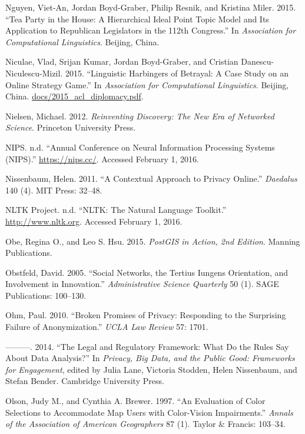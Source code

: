 \documentclass[]{krantz}
\begin{document}
\hypertarget{ref-Nguyen:Boyd-Graber:Resnik:Miler-2015}{}
Nguyen, Viet-An, Jordan Boyd-Graber, Philip Resnik, and Kristina Miler.
2015. ``Tea Party in the House: A Hierarchical Ideal Point Topic Model
and Its Application to Republican Legislators in the 112th Congress.''
In \emph{Association for Computational Linguistics}. Beijing, China.

\hypertarget{ref-niculae-15}{}
Niculae, Vlad, Srijan Kumar, Jordan Boyd-Graber, and Cristian
Danescu-Niculescu-Mizil. 2015. ``Linguistic Harbingers of Betrayal: A
Case Study on an Online Strategy Game.'' In \emph{Association for
Computational Linguistics}. Beijing, China.
\url{docs/2015_acl_diplomacy.pdf}.

\hypertarget{ref-nielsen2012reinventing}{}
Nielsen, Michael. 2012. \emph{Reinventing Discovery: The New Era of
Networked Science}. Princeton University Press.

\hypertarget{ref-nips}{}
NIPS. n.d. ``Annual Conference on Neural Information Processing Systems
(NIPS).'' \url{https://nips.cc/}. Accessed February 1, 2016.

\hypertarget{ref-nissenbaum2011contextual}{}
Nissenbaum, Helen. 2011. ``A Contextual Approach to Privacy Online.''
\emph{Daedalus} 140 (4). MIT Press: 32--48.

\hypertarget{ref-NLTKweb}{}
NLTK Project. n.d. ``NLTK: The Natural Language Toolkit.''
\url{http://www.nltk.org}. Accessed February 1, 2016.

\hypertarget{ref-PostGISInAction}{}
Obe, Regina O., and Leo S. Hsu. 2015. \emph{PostGIS in Action, 2nd
Edition}. Manning Publications.

\hypertarget{ref-obstfeld2005social}{}
Obstfeld, David. 2005. ``Social Networks, the Tertius Iungens
Orientation, and Involvement in Innovation.'' \emph{Administrative
Science Quarterly} 50 (1). SAGE Publications: 100--130.

\hypertarget{ref-ohm2010broken}{}
Ohm, Paul. 2010. ``Broken Promises of Privacy: Responding to the
Surprising Failure of Anonymization.'' \emph{UCLA Law Review} 57: 1701.

\hypertarget{ref-Ohm2014}{}
---------. 2014. ``The Legal and Regulatory Framework: What Do the Rules
Say About Data Analysis?'' In \emph{Privacy, Big Data, and the Public
Good: Frameworks for Engagement}, edited by Julia Lane, Victoria
Stodden, Helen Nissenbaum, and Stefan Bender. Cambridge University
Press.

\hypertarget{ref-olson1997evaluation}{}
Olson, Judy M., and Cynthia A. Brewer. 1997. ``An Evaluation of Color
Selections to Accommodate Map Users with Color-Vision Impairments.''
\emph{Annals of the Association of American Geographers} 87 (1). Taylor
\& Francis: 103--34.
\end{document}
